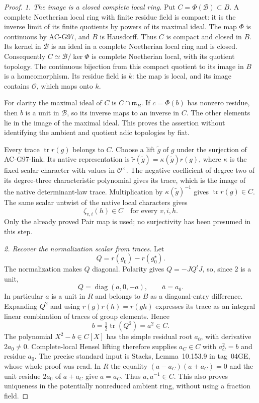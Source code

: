 \begin{proof}
\emph{1. The image is a closed complete local ring.}
Put $C=\Phi(\mathscr B)\subset B$.  A complete Noetherian
local ring with finite residue field is compact: it is the
inverse limit of its finite quotients by powers of its maximal
ideal.  The map $\Phi$ is continuous by AC-G97, and $B$ is
Hausdorff.  Thus $C$ is compact and closed in $B$.
Its kernel in $\mathscr B$ is an ideal in a complete Noetherian
local ring and is closed.  Consequently
$C\simeq\mathscr B/\ker\Phi$ is complete Noetherian local,
with its quotient topology.  The continuous bijection from
this compact quotient to its image in $B$ is a homeomorphism.
Its residue field is $k$: the map is local, and its image
contains $\mathcal O$, which maps onto $k$.

For clarity the maximal ideal of $C$ is $C\cap\mathfrak m_B$.
If $c=\Phi(b)$ has nonzero residue, then $b$ is a unit in
$\mathscr B$, so its inverse maps to an inverse in $C$.
The other elements lie in the image of the maximal ideal.
This proves the assertion without identifying the ambient
and quotient adic topologies by fiat.

Every trace $\operatorname{tr}r(g)$ belongs to $C$.
Choose a lift $\widetilde g$ of $g$ under the surjection of
AC-G97-link.  Its native representation is
$\widetilde r(\widetilde g)=\kappa(\widetilde g)r(g)$,
where $\kappa$ is the fixed scalar character with values in
$\mathcal O^\times$.  The negative coefficient of degree two of its
degree-three characteristic polynomial gives its trace,
which is the image of the native determinant-law trace.
Multiplication by $\kappa(\widetilde g)^{-1}$ gives
$\operatorname{tr}r(g)\in C$.
The same scalar untwist of the native local characters gives
\[
                   \zeta_{v,i}(h)\in C
                   \quad\text{for every }v,i,h.
\tag{G102.3}
\]
Only the already proved Pair map is used; no surjectivity
has been presumed in this step.

\emph{2. Recover the normalization scalar from traces.}
Let
\[
                         Q=r(g_0)-r(g_0^\star).
\tag{G102.4}
\]
The normalization makes $Q$ diagonal.  Polarity gives
$Q=-JQ^tJ$, so, since $2$ is a unit,
\[
                 Q=\operatorname{diag}(a,0,-a),
                 \qquad \overline a=a_0.
\tag{G102.5}
\]
In particular $a$ is a unit in $R$ and belongs to $B$ as a
diagonal-entry difference.  Expanding $Q^2$ and using
$r(g)r(h)=r(gh)$ expresses its trace as an integral linear
combination of traces of group elements.  Hence
\[
                         b=\tfrac12\operatorname{tr}(Q^2)
                           =a^2\in C.
\tag{G102.6}
\]
The polynomial $X^2-b\in C[X]$ has the simple residual root
$a_0$, with derivative $2a_0\ne0$.  Complete-local Hensel
lifting therefore supplies $a_C\in C$ with $a_C^2=b$ and
residue $a_0$.  The precise standard input is Stacks,
Lemma~10.153.9 in tag~04GE, whose whole proof was read.
In $R$ the equality
$(a-a_C)(a+a_C)=0$ and the unit residue $2a_0$ of $a+a_C$
give $a=a_C$.  Thus $a,a^{-1}\in C$.
This also proves uniqueness in the potentially nonreduced
ambient ring, without using a fraction field.


\end{proof}
